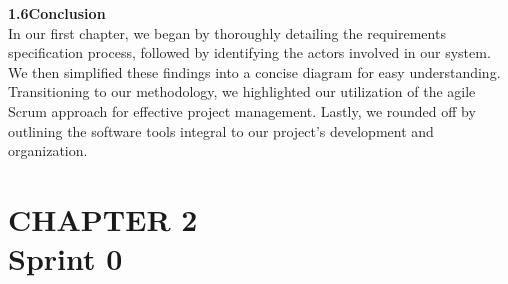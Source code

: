 \documentclass{article}
\begin{document}
{\Large \textbf{1.6\hspace{1em}Conclusion}}\vspace{0.2cm}\\
In our first chapter, we began by thoroughly detailing the requirements specification process, followed by identifying the actors involved in our system. We then simplified these findings into a concise diagram for easy understanding. Transitioning to our methodology, we highlighted our utilization of the agile Scrum approach for effective project management. Lastly, we rounded off by outlining the software tools integral to our project's development and organization.
\newpage
\section*{\Huge CHAPTER 2\vspace{0.5cm}\\Sprint 0}
\vspace{1.5cm}
\end{document}
